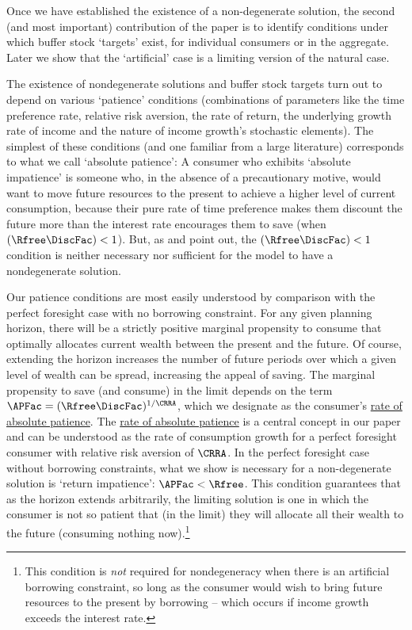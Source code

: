 \documentclass[BufferStockTheory]{subfiles}
\begin{document}
Once we have established the existence of a non-degenerate solution, the second (and most important) contribution of the paper is to identify conditions under which buffer stock `targets' exist, for individual consumers or in the aggregate.
Later we show that the `artificial' case is a limiting version of the natural case.



% 


The existence of nondegenerate solutions and buffer stock targets turn out to depend on various `patience' conditions (combinations of parameters like the time preference rate, relative risk aversion, the rate of return, the underlying growth rate of income and the nature of income growth's stochastic elements).
The simplest of these conditions (and one familiar from a large literature) corresponds to what we call `absolute patience':  A consumer who exhibits `absolute impatience' is someone who, in the absence of a precautionary motive, would want to move future resources to the present to achieve a higher level of current consumption, because their pure rate of time preference makes them discount the future more than the interest rate encourages them to save (when $(\Rfree \DiscFac)<1$).
But, as \cite{szeidlInvariant} and \cite{maUnboundedDP} point out, the $(\Rfree \DiscFac)<1$ condition is neither necessary nor sufficient for the model to have a nondegenerate solution.


Our patience conditions are most easily understood by comparison with the perfect foresight case with no borrowing constraint.
For any given planning horizon, there will be a strictly positive marginal propensity to consume that optimally allocates current wealth between the present and the future.
Of course, extending the horizon increases the number of future periods over which a given level of wealth can be spread, increasing the appeal of saving.
The marginal propensity to save (and consume) in the limit depends on the term $\APFac=(\Rfree \DiscFac)^{1/\CRRA}$, which we designate as the consumer's \hyperlink{APFAC}{rate of absolute patience}.
The \hyperlink{APFAC}{rate of absolute patience} is a central concept in our paper and can be understood as the rate of consumption growth for a perfect foresight consumer with relative risk aversion of $\CRRA$.
In the perfect foresight case without borrowing constraints, what we show is necessary for a non-degenerate solution is `return impatience': $\APFac < \Rfree$.
This condition guarantees that as the horizon extends arbitrarily, the limiting solution is one in which the consumer is not so patient that (in the limit) they will allocate all their wealth to the future (consuming nothing now).\footnote{This condition is \textit{not} required for nondegeneracy when there is an artificial borrowing constraint, so long as the consumer would wish to bring future resources to the present by borrowing -- which occurs if income growth exceeds the interest rate.}
\end{document}
